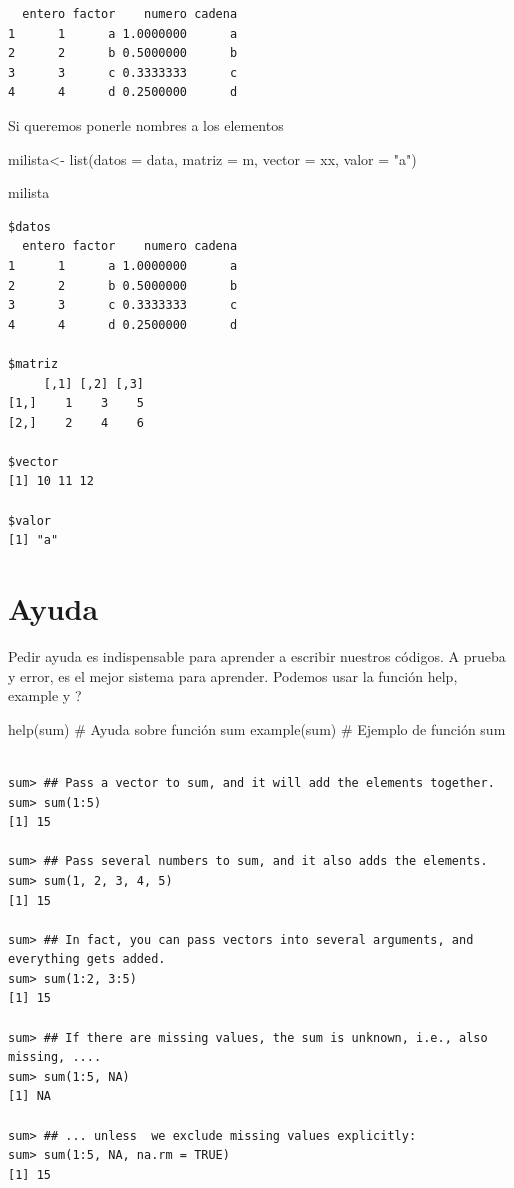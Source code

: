 \documentclass[
  letterpaper,
  DIV=11,
  numbers=noendperiod]{scrreprt}
\newenvironment{Shaded}{\begin{snugshade}}{\end{snugshade}}
\newcommand{\AttributeTok}[1]{\textcolor[rgb]{0.40,0.45,0.13}{#1}}
\newcommand{\CommentTok}[1]{\textcolor[rgb]{0.37,0.37,0.37}{#1}}
\newcommand{\FunctionTok}[1]{\textcolor[rgb]{0.28,0.35,0.67}{#1}}
\newcommand{\NormalTok}[1]{\textcolor[rgb]{0.00,0.23,0.31}{#1}}
\newcommand{\OtherTok}[1]{\textcolor[rgb]{0.00,0.23,0.31}{#1}}
\newcommand{\StringTok}[1]{\textcolor[rgb]{0.13,0.47,0.30}{#1}}
\begin{document}
\begin{verbatim}
  entero factor    numero cadena
1      1      a 1.0000000      a
2      2      b 0.5000000      b
3      3      c 0.3333333      c
4      4      d 0.2500000      d
\end{verbatim}

Si queremos ponerle nombres a los elementos

\begin{Shaded}
\begin{Highlighting}[]
\NormalTok{milista}\OtherTok{\textless{}{-}} \FunctionTok{list}\NormalTok{(}\AttributeTok{datos =}\NormalTok{ data, }
               \AttributeTok{matriz =}\NormalTok{ m, }
               \AttributeTok{vector =}\NormalTok{ xx,}
               \AttributeTok{valor =} \StringTok{"a"}\NormalTok{)}

\NormalTok{milista}
\end{Highlighting}
\end{Shaded}

\begin{verbatim}
$datos
  entero factor    numero cadena
1      1      a 1.0000000      a
2      2      b 0.5000000      b
3      3      c 0.3333333      c
4      4      d 0.2500000      d

$matriz
     [,1] [,2] [,3]
[1,]    1    3    5
[2,]    2    4    6

$vector
[1] 10 11 12

$valor
[1] "a"
\end{verbatim}

\hypertarget{ayuda}{%
\section{Ayuda}\label{ayuda}}

Pedir ayuda es indispensable para aprender a escribir nuestros códigos.
A prueba y error, es el mejor sistema para aprender. Podemos usar la
función help, example y ?

\begin{Shaded}
\begin{Highlighting}[]
\FunctionTok{help}\NormalTok{(sum)         }\CommentTok{\# Ayuda sobre función sum}
\FunctionTok{example}\NormalTok{(sum)      }\CommentTok{\# Ejemplo de función sum}
\end{Highlighting}
\end{Shaded}

\begin{verbatim}

sum> ## Pass a vector to sum, and it will add the elements together.
sum> sum(1:5)
[1] 15

sum> ## Pass several numbers to sum, and it also adds the elements.
sum> sum(1, 2, 3, 4, 5)
[1] 15

sum> ## In fact, you can pass vectors into several arguments, and everything gets added.
sum> sum(1:2, 3:5)
[1] 15

sum> ## If there are missing values, the sum is unknown, i.e., also missing, ....
sum> sum(1:5, NA)
[1] NA

sum> ## ... unless  we exclude missing values explicitly:
sum> sum(1:5, NA, na.rm = TRUE)
[1] 15
\end{verbatim}
\end{document}
